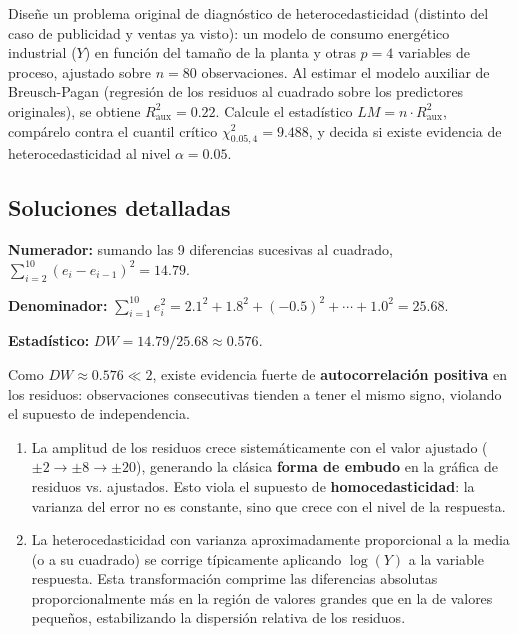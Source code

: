 \begin{problema}
	\label{prob:f0b580a}
	Diseñe un problema original de diagnóstico de heterocedasticidad (distinto del caso de publicidad y ventas ya visto): un modelo de consumo energético industrial ($Y$) en función del tamaño de la planta y otras $p=4$ variables de proceso, ajustado sobre $n=80$ observaciones. Al estimar el modelo auxiliar de Breusch-Pagan (regresión de los residuos al cuadrado sobre los predictores originales), se obtiene $R_{\text{aux}}^2 = 0.22$. Calcule el estadístico $LM = n\cdot R_{\text{aux}}^2$, compárelo contra el cuantil crítico $\chi^2_{0.05,4} = 9.488$, y decida si existe evidencia de heterocedasticidad al nivel $\alpha=0.05$.
\end{problema}

\subsection*{Soluciones detalladas}

\begin{solproblema}[prob:c7c2f12]
	\textbf{Numerador:} sumando las 9 diferencias sucesivas al cuadrado, $\sum_{i=2}^{10}(e_i-e_{i-1})^2 = 14.79$.

	\textbf{Denominador:} $\sum_{i=1}^{10} e_i^2 = 2.1^2+1.8^2+(-0.5)^2+\cdots+1.0^2 = 25.68$.

	\textbf{Estadístico:} $DW = 14.79/25.68 \approx 0.576$.

	Como $DW\approx0.576\ll2$, existe evidencia fuerte de \textbf{autocorrelación positiva} en los residuos: observaciones consecutivas tienden a tener el mismo signo, violando el supuesto de independencia.
\end{solproblema}

\begin{solproblema}[prob:90810fe]
	\begin{enumerate}
		\item La amplitud de los residuos crece sistemáticamente con el valor ajustado ($\pm2\to\pm8\to\pm20$), generando la clásica \textbf{forma de embudo} en la gráfica de residuos vs. ajustados. Esto viola el supuesto de \textbf{homocedasticidad}: la varianza del error no es constante, sino que crece con el nivel de la respuesta.
		\item La heterocedasticidad con varianza aproximadamente proporcional a la media (o a su cuadrado) se corrige típicamente aplicando $\log(Y)$ a la variable respuesta. Esta transformación comprime las diferencias absolutas proporcionalmente más en la región de valores grandes que en la de valores pequeños, estabilizando la dispersión relativa de los residuos.
	\end{enumerate}
\end{solproblema}

